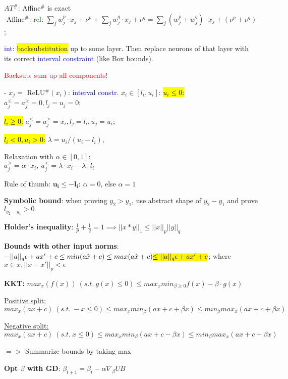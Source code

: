 \documentclass[11pt,landscape,a4paper,fleqn]{article}
\newcommand{\mhl}[1]{\setlength{\fboxsep}{0pt}\colorbox{yellow}{#1}}
\begin{document}
\begin{multicols*}{4}
$AT^\#$: Affine$^\#$ is exact\\
-Affine$^\#$: \textcolor{darkgreen}{rel}: $\sum_j w_j^p \cdot x_j + \nu^p + \sum_j w_j^q \cdot x_j + \nu^q = \sum_j (w_j^p + w_j^q) \cdot x_j + (\nu^p + \nu^q)$;

\textcolor{blue}{int}: \mhl{backsubstitution} up to some layer. Then replace neurons of that layer with its correct \textcolor{blue}{interval constraint} (like Box bounds).

\textcolor{red}{Backsub: sum up all components!}

- $x_j =$ ReLU$^\#(x_i)$: \textcolor{blue}{interval constr.} $x_i \in [l_i, u_i]$:
\hl{$u_i \leq 0$:} $a_j^\leq = a_j^\geq = 0, l_j = u_j = 0$;

\hl{$l_i \geq 0$:} $a_j^\leq = a_j^\geq = x_i, l_j = l_i, u_j = u_i$;

\hl{$l_i < 0, u_i > 0$:} $\lambda = u_i / (u_i - l_i)$,

Relaxation with $\alpha \in [0,1]$: \\ $a_j^\geq = \alpha \cdot x_i, \ a_j^\leq = \lambda \cdot x_i - \lambda \cdot l_i$

Rule of thumb: $\mathbf{u_i \leq - l_i:} \ \alpha = 0$, else $\alpha = 1$

\textbf{Symbolic bound}: when proving $y_2 > y_1$, use abstract shape of $y_2 - y_1$ and prove $l_{y_2 - y_1} > 0$

\textbf{Holder's inequality}: $\frac{1}{p}+\frac{1}{q} = 1 \implies ||x*y||_1 \leq ||x||_p||y||_q$

\textbf{Bounds with other input norms}: \\$-||a||_q\epsilon+ax'+c \leq min(a\hat{x}+c) \leq max(a\hat{x} +c) \text{\mhl{$\leq ||a||_q\epsilon+ax'+c$}}$;  where $\hat{x}\in {x, ||x-x'||_p<\epsilon}$

\textbf{KKT:} $max_x(f(x)) \ (s.t. \  g(x) \leq 0) \leq max_x min_{\beta \geq 0} f(x) - \beta \cdot g(x) $

\underline{Positive split:}\\
$max_x(ax+c) \ (s.t. \  -x\leq0) \leq max_x min_\beta(ax+c+\beta x) \leq min_\beta max_x (ax+c + \beta x)$ 

\underline{Negative split:}\\
$max_x(ax+c) \ (s.t. \ x\leq0) \leq max_x min_\beta (ax +c - \beta x) \leq min_\beta max_x(ax+c-\beta x)$

$=>$ Summarize bounds by taking max

\textbf{Opt $\beta$ with GD}: $\beta_{t+1} = \beta_t - \alpha \nabla_\beta UB $


\end{multicols*}
\end{document}
